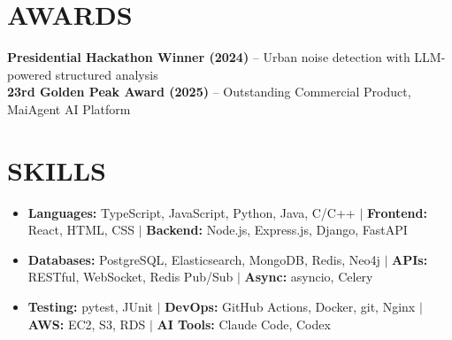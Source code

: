 \documentclass[letterpaper,11pt]{article}
\begin{document}
\section{AWARDS}
{\noindent\small
  \textbf{Presidential Hackathon Winner (2024)} -- Urban noise detection with LLM-powered structured analysis
  \\ \textbf{23rd Golden Peak Award (2025)} -- Outstanding Commercial Product, MaiAgent AI Platform
}

\section{SKILLS}
\begin{itemize}[leftmargin=0in, label={}]
\item\small{\textbf{Languages:} TypeScript, JavaScript, Python, Java, C/C++ $|$ \textbf{Frontend:} React, HTML, CSS $|$ \textbf{Backend:} Node.js, Express.js, Django, FastAPI}
\item\small{\textbf{Databases:} PostgreSQL, Elasticsearch, MongoDB, Redis, Neo4j $|$ \textbf{APIs:} RESTful, WebSocket, Redis Pub/Sub $|$ \textbf{Async:} asyncio, Celery}
\item\small{\textbf{Testing:} pytest, JUnit $|$ \textbf{DevOps:} GitHub Actions, Docker, git, Nginx $|$ \textbf{AWS:} EC2, S3, RDS $|$ \textbf{AI Tools:} Claude Code, Codex}
\end{itemize}
\end{document}
